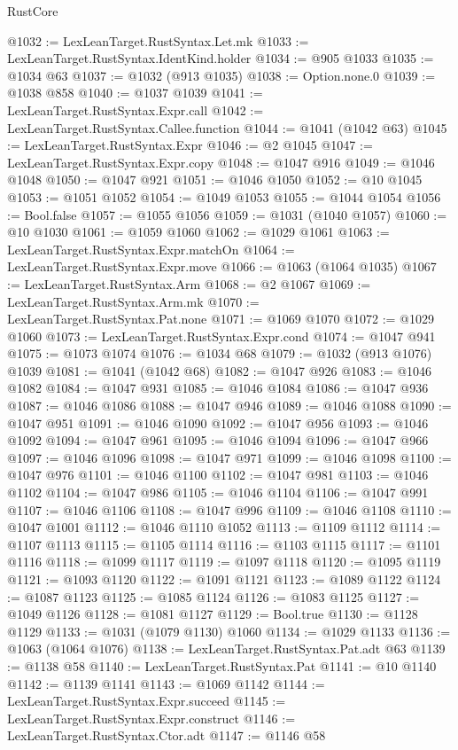 \begin{lexlean}{RustCore}
\begin{coremodule}
@1032 := LexLeanTarget.RustSyntax.Let.mk
@1033 := LexLeanTarget.RustSyntax.IdentKind.holder
@1034 := @905 @1033
@1035 := @1034 @63
@1037 := @1032 (@913 @1035)
@1038 := Option.none.{0}
@1039 := @1038 @858
@1040 := @1037 @1039
@1041 := LexLeanTarget.RustSyntax.Expr.call
@1042 := LexLeanTarget.RustSyntax.Callee.function
@1044 := @1041 (@1042 @63)
@1045 := LexLeanTarget.RustSyntax.Expr
@1046 := @2 @1045
@1047 := LexLeanTarget.RustSyntax.Expr.copy
@1048 := @1047 @916
@1049 := @1046 @1048
@1050 := @1047 @921
@1051 := @1046 @1050
@1052 := @10 @1045
@1053 := @1051 @1052
@1054 := @1049 @1053
@1055 := @1044 @1054
@1056 := Bool.false
@1057 := @1055 @1056
@1059 := @1031 (@1040 @1057)
@1060 := @10 @1030
@1061 := @1059 @1060
@1062 := @1029 @1061
@1063 := LexLeanTarget.RustSyntax.Expr.matchOn
@1064 := LexLeanTarget.RustSyntax.Expr.move
@1066 := @1063 (@1064 @1035)
@1067 := LexLeanTarget.RustSyntax.Arm
@1068 := @2 @1067
@1069 := LexLeanTarget.RustSyntax.Arm.mk
@1070 := LexLeanTarget.RustSyntax.Pat.none
@1071 := @1069 @1070
@1072 := @1029 @1060
@1073 := LexLeanTarget.RustSyntax.Expr.cond
@1074 := @1047 @941
@1075 := @1073 @1074
@1076 := @1034 @68
@1079 := @1032 (@913 @1076) @1039
@1081 := @1041 (@1042 @68)
@1082 := @1047 @926
@1083 := @1046 @1082
@1084 := @1047 @931
@1085 := @1046 @1084
@1086 := @1047 @936
@1087 := @1046 @1086
@1088 := @1047 @946
@1089 := @1046 @1088
@1090 := @1047 @951
@1091 := @1046 @1090
@1092 := @1047 @956
@1093 := @1046 @1092
@1094 := @1047 @961
@1095 := @1046 @1094
@1096 := @1047 @966
@1097 := @1046 @1096
@1098 := @1047 @971
@1099 := @1046 @1098
@1100 := @1047 @976
@1101 := @1046 @1100
@1102 := @1047 @981
@1103 := @1046 @1102
@1104 := @1047 @986
@1105 := @1046 @1104
@1106 := @1047 @991
@1107 := @1046 @1106
@1108 := @1047 @996
@1109 := @1046 @1108
@1110 := @1047 @1001
@1112 := @1046 @1110 @1052
@1113 := @1109 @1112
@1114 := @1107 @1113
@1115 := @1105 @1114
@1116 := @1103 @1115
@1117 := @1101 @1116
@1118 := @1099 @1117
@1119 := @1097 @1118
@1120 := @1095 @1119
@1121 := @1093 @1120
@1122 := @1091 @1121
@1123 := @1089 @1122
@1124 := @1087 @1123
@1125 := @1085 @1124
@1126 := @1083 @1125
@1127 := @1049 @1126
@1128 := @1081 @1127
@1129 := Bool.true
@1130 := @1128 @1129
@1133 := @1031 (@1079 @1130) @1060
@1134 := @1029 @1133
@1136 := @1063 (@1064 @1076)
@1138 := LexLeanTarget.RustSyntax.Pat.adt @63
@1139 := @1138 @58
@1140 := LexLeanTarget.RustSyntax.Pat
@1141 := @10 @1140
@1142 := @1139 @1141
@1143 := @1069 @1142
@1144 := LexLeanTarget.RustSyntax.Expr.succeed
@1145 := LexLeanTarget.RustSyntax.Expr.construct
@1146 := LexLeanTarget.RustSyntax.Ctor.adt
@1147 := @1146 @58

\end{coremodule}
\end{lexlean}
